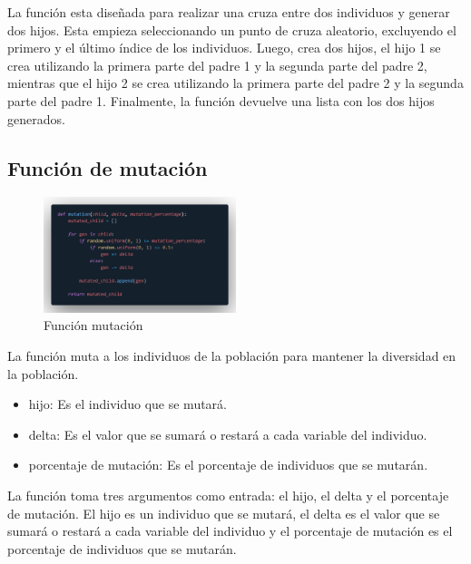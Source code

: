 \documentclass{report}
\begin{document}
    La función esta diseñada para realizar una cruza entre dos individuos y generar dos hijos. 
    Esta empieza seleccionando un punto de cruza aleatorio, excluyendo el primero y el último índice de los individuos.
    Luego, crea dos hijos, el hijo 1 se crea utilizando la primera parte del padre 1 y la segunda parte del padre 2, 
    mientras que el hijo 2 se crea utilizando la primera parte del padre 2 y la segunda parte del padre 1.
    Finalmente, la función devuelve una lista con los dos hijos generados.

    \subsection*{Función de mutación}
    \begin{figure}[h]
        \centering
        \includegraphics[width=0.5\textwidth]{funcionMutacion.png}
        \caption{Función mutación}
    \end{figure}

    La función muta a los individuos de la población para mantener la diversidad en la población.

    \begin{itemize}
        \item hijo: Es el individuo que se mutará.
        \item delta: Es el valor que se sumará o restará a cada variable del individuo.
        \item porcentaje de mutación: Es el porcentaje de individuos que se mutarán.
    \end{itemize}

    La función toma tres argumentos como entrada: el hijo, el delta y el porcentaje de mutación.
    El hijo es un individuo que se mutará, el delta es el valor que se sumará o restará a cada variable del individuo 
    y el porcentaje de mutación es el porcentaje de individuos que se mutarán.
\end{document}
